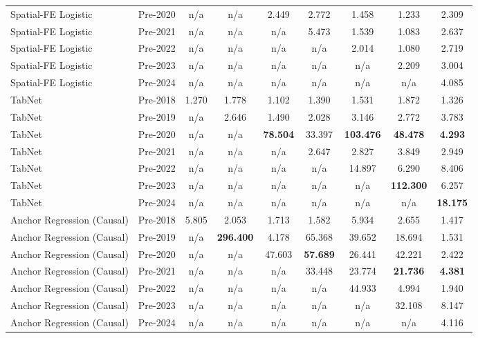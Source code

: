 \begin{table}[htbp]
{\begin{tabular}{l lccccccc}
Spatial-FE Logistic & Pre-2020 & n/a & n/a & 2.449 & 2.772 & 1.458 & 1.233 & 2.309 \\
Spatial-FE Logistic & Pre-2021 & n/a & n/a & n/a & 5.473 & 1.539 & 1.083 & 2.637 \\
Spatial-FE Logistic & Pre-2022 & n/a & n/a & n/a & n/a & 2.014 & 1.080 & 2.719 \\
Spatial-FE Logistic & Pre-2023 & n/a & n/a & n/a & n/a & n/a & 2.209 & 3.004 \\
Spatial-FE Logistic & Pre-2024 & n/a & n/a & n/a & n/a & n/a & n/a & 4.085 \\
TabNet & Pre-2018 & 1.270 & 1.778 & 1.102 & 1.390 & 1.531 & 1.872 & 1.326 \\
TabNet & Pre-2019 & n/a & 2.646 & 1.490 & 2.028 & 3.146 & 2.772 & 3.783 \\
TabNet & Pre-2020 & n/a & n/a & \textbf{78.504} & 33.397 & \textbf{103.476} & \textbf{48.478} & \textbf{4.293} \\
TabNet & Pre-2021 & n/a & n/a & n/a & 2.647 & 2.827 & 3.849 & 2.949 \\
TabNet & Pre-2022 & n/a & n/a & n/a & n/a & 14.897 & 6.290 & 8.406 \\
TabNet & Pre-2023 & n/a & n/a & n/a & n/a & n/a & \textbf{112.300} & 6.257 \\
TabNet & Pre-2024 & n/a & n/a & n/a & n/a & n/a & n/a & \textbf{18.175} \\
Anchor Regression (Causal) & Pre-2018 & 5.805 & 2.053 & 1.713 & 1.582 & 5.934 & 2.655 & 1.417 \\
Anchor Regression (Causal) & Pre-2019 & n/a & \textbf{296.400} & 4.178 & 65.368 & 39.652 & 18.694 & 1.531 \\
Anchor Regression (Causal) & Pre-2020 & n/a & n/a & 47.603 & \textbf{57.689} & 26.441 & 42.221 & 2.422 \\
Anchor Regression (Causal) & Pre-2021 & n/a & n/a & n/a & 33.448 & 23.774 & \textbf{21.736} & \textbf{4.381} \\
Anchor Regression (Causal) & Pre-2022 & n/a & n/a & n/a & n/a & 44.933 & 4.994 & 1.940 \\
Anchor Regression (Causal) & Pre-2023 & n/a & n/a & n/a & n/a & n/a & 32.108 & 8.147 \\
Anchor Regression (Causal) & Pre-2024 & n/a & n/a & n/a & n/a & n/a & n/a & 4.116 \\
\bottomrule
\end{tabular}%
}
\end{table}
